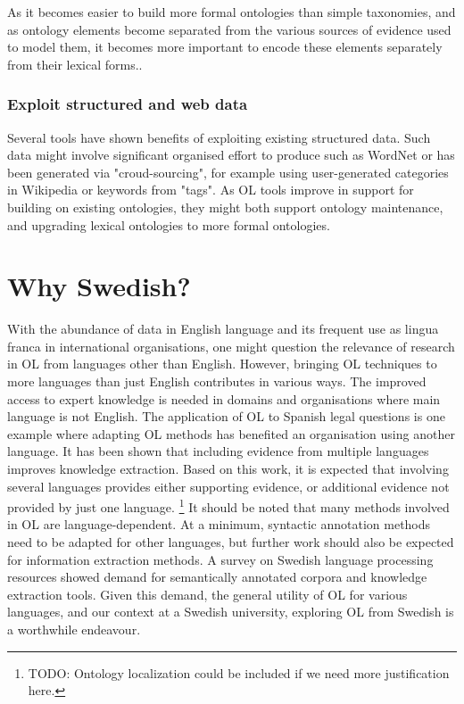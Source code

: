 \documentclass[a4paper]{report}
\newcommand{\todo}[1]{\footnote{{\color{red} TODO: #1}}}
\begin{document}
As it becomes easier to build more formal ontologies than simple taxonomies, and as ontology elements become separated from the various sources of evidence used to model them, it becomes more important to encode these elements separately from their lexical forms.\cite{Wong11Survey}.

\subsubsection{Exploit structured and web data}

Several tools have shown benefits of exploiting existing structured data.
Such data might involve significant organised effort to produce such as WordNet\cite{Fellbaum98WordNet} or has been generated via "croud-sourcing", for example using user-generated categories in Wikipedia or keywords from "tags"\cite{Wong11Survey}.
As OL tools improve in support for building on existing ontologies, they might both support ontology maintenance, and upgrading lexical ontologies to more formal ontologies\cite{Wong11Survey}.

\section{Why Swedish?}
\label{sec:background:swedish}

With the abundance of data in English language and its frequent use as lingua franca in international organisations, one might question the relevance of research in OL from languages other than English.
However, bringing OL techniques to more languages than just English contributes in various ways.
The improved access to expert knowledge is needed in domains and organisations where main language is not English.
The application of OL to Spanish legal questions is one example where adapting OL methods has benefited an organisation using another language\cite{Voelkner2008Spanish}.
It has been shown that including evidence from multiple languages improves knowledge extraction\cite{Hjelm09Thesis}.
Based on this work, it is expected that involving several languages provides either supporting evidence, or additional evidence not provided by just one language\cite{Hjelm09Thesis}.
\todo{Ontology localization could be included if we need more justification here.}
It should be noted that many methods involved in OL are language-dependent.
At a minimum, syntactic annotation methods need to be adapted for other languages, but further work should also be expected for information extraction methods.
A survey on Swedish language processing resources showed demand for semantically annotated corpora and knowledge extraction tools\cite{EleniusEtAl08SwedTools}.
Given this demand, the general utility of OL for various languages, and our context at a Swedish university, exploring OL from Swedish is a worthwhile endeavour.
\end{document}
